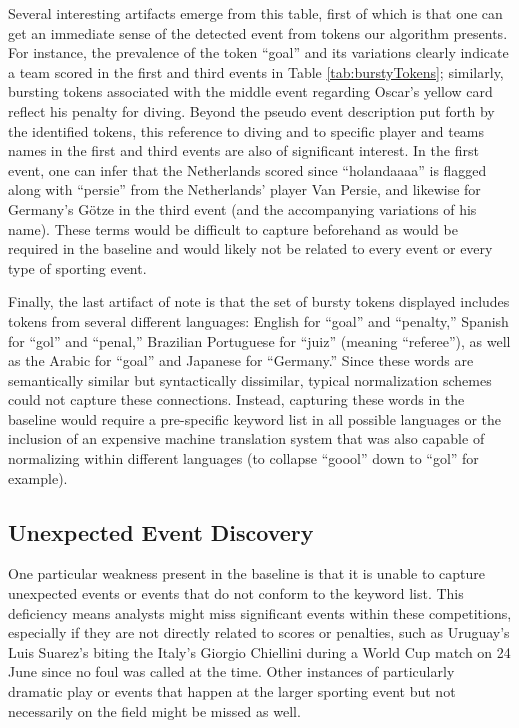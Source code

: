 \documentclass{sig-alternate}
\begin{document}
Several interesting artifacts emerge from this table, first of which is that one can get an immediate sense of the detected event from tokens our algorithm presents. 
For instance, the prevalence of the token ``goal'' and its variations clearly indicate a team scored in the first and third events in Table \ref{tab:burstyTokens}; similarly, bursting tokens associated with the middle event regarding Oscar's yellow card reflect his penalty for diving.
Beyond the pseudo event description put forth by the identified tokens, this reference to diving and to specific player and teams names in the first and third events are also of significant interest.
In the first event, one can infer that the Netherlands scored since ``holandaaaa'' is flagged along with ``persie'' from the Netherlands' player Van Persie, and likewise for Germany's G\"{o}tze in the third event (and the accompanying variations of his name).
These terms would be difficult to capture beforehand as would be required in the baseline and would likely not be related to every event or every type of sporting event.

Finally, the last artifact of note is that the set of bursty tokens displayed includes tokens from several different languages: English for ``goal'' and ``penalty,'' Spanish for ``gol'' and ``penal,'' Brazilian Portuguese for ``juiz'' (meaning ``referee''), as well as the Arabic for ``goal'' and Japanese for ``Germany.''
Since these words are semantically similar but syntactically dissimilar, typical normalization schemes could not capture these connections.
Instead, capturing these words in the baseline would require a pre-specific keyword list in all possible languages or the inclusion of an expensive machine translation system that was also capable of normalizing within different languages (to collapse ``goool'' down to ``gol'' for example).

\subsection{Unexpected Event Discovery}
\label{sect:eventDiscovery}

One particular weakness present in the baseline is that it is unable to capture unexpected events or events that do not conform to the keyword list.
This deficiency means analysts might miss significant events within these competitions, especially if they are not directly related to scores or penalties, such as Uruguay's Luis Suarez's biting the Italy's Giorgio Chiellini during a World Cup match on 24 June since no foul was called at the time.
Other instances of particularly dramatic play or events that happen at the larger sporting event but not necessarily on the field might be missed as well.
\end{document}
